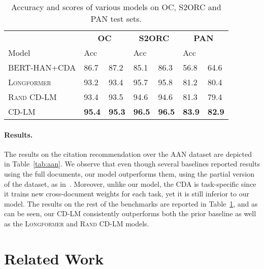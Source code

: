 \documentclass[11pt,a4paper]{article}
\begin{document}
\begin{table}[bt]
\centering
\small
  \def\arraystretch{1.12}\tabcolsep=4pt    
\begin{tabular}{lllllll}
                      \toprule
                      & \multicolumn{2}{c}{\textbf{OC}} & \multicolumn{2}{c}{\textbf{S2ORC}} &  \multicolumn{2}{c}{\textbf{PAN}}\\
Model                     & Acc              &            & Acc           &       & Acc &  \\ \toprule
  \textsc{BERT-HAN+CDA}    &            86.7      &        87.2      &        85.1     &    86.3    & 56.8 &   64.6 \\ 
  \midrule
 \textsc{Longformer}    &         93.2         &        93.4      &       95.7       &    95.8    & 81.2  &  80.4  \\ 
 \textsc{Rand CD-LM}    &         93.4         &      93.5        &    94.6          &   94.6     &  81.3 &  79.4  \\ 
 \textsc{CD-LM}         &          \textbf{95.4}       &       \textbf{95.3 }     &      \textbf{96.5}      &  \textbf{96.5}     & \textbf{83.9} & \textbf{82.9}\\ 
\bottomrule
\end{tabular}
\caption{Accuracy and  scores of various models on OC, S2ORC and PAN test sets.}\smallskip
\label{tab:aan2}
\vspace{-3mm}

\end{table}
 
\paragraph{Results.} The results on the citation recommendation over the AAN dataset are depicted in Table~\ref{tab:aan}. We observe that even though several baselines reported results using the full documents, our model outperforms them, using the partial version of the dataset, as in~\cite{zhou-etal-2020-multilevel}. Moreover, unlike our model, the CDA is task-specific since it trains new cross-document weights for each task, yet it is still inferior to our model. The results on the rest of the benchmarks are reported in Table~\ref{tab:aan2}, and as can be seen, our \textsc{CD-LM} consistently outperforms both the prior baseline as well as the \textsc{Longformer} and \textsc{Rand CD-LM} models.   \section{Related Work}
\label{sec:related}
\end{document}
